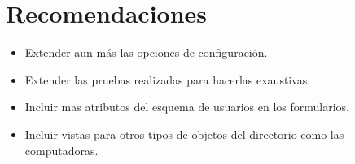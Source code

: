 \section{Recomendaciones}

\begin{itemize}
  \item Extender aun más las opciones de configuración.
  \item Extender las pruebas realizadas para hacerlas exaustivas.
  \item Incluir mas atributos del esquema de usuarios en los formularios.
  \item Incluir vistas para otros tipos de objetos del directorio como las computadoras.
\end{itemize}
